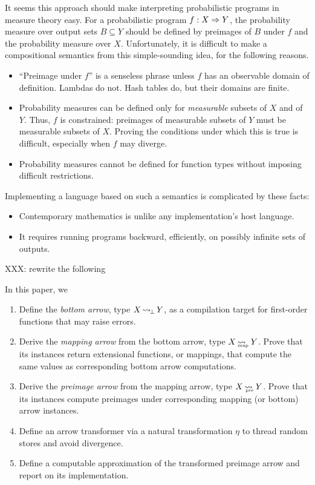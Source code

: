 \documentclass[preprint]{sigplanconf}
\newcommand{\arrow}{\rightsquigarrow}
\newcommand{\arrowtrans}{\ensuremath{\eta}}
\DeclareMathOperator{\botto}{\arrow_{\mspace{-3mu}\bot}}
\newcommand{\map}{_\mathrm{map}}
\DeclareMathOperator{\mapto}{\arrow_{\mspace{-21mu}\map}}
\newcommand{\pre}{_\mathrm{pre}}
\DeclareMathOperator{\preto}{\arrow_{\mspace{-19mu}\pre}}
\begin{document}
It seems this approach should make interpreting probabilistic programs in measure theory easy.
For a probabilistic program $f : X \Rightarrow Y$, the probability measure over output sets $B \subseteq Y$ should be defined by preimages of $B$ under $f$ and the probability measure over $X$.
Unfortunately, it is difficult to make a compositional semantics from this simple-sounding idea, for the following reasons.
\begin{itemize}
	\item ``Preimage under $f$'' is a senseless phrase unless $f$ has an observable domain of definition. Lambdas do not. Hash tables do, but their domains are finite.
	\item Probability measures can be defined only for \emph{measurable} subsets of $X$ and of $Y$. Thus, $f$ is constrained: preimages of measurable subsets of $Y$ must be measurable subsets of $X$. Proving the conditions under which this is true is difficult, especially when $f$ may diverge.
	\item Probability measures cannot be defined for function types without imposing difficult restrictions.
\end{itemize}
Implementing a language based on such a semantics is complicated by these facts:
\begin{itemize}
	\item Contemporary mathematics is unlike any implementation's host language.
	\item It requires running programs backward, efficiently, on possibly infinite sets of outputs.
\end{itemize}

XXX: rewrite the following

In this paper, we
\begin{enumerate}
	\item Define the \emph{bottom arrow}, type $X \botto Y$, as a compilation target for first-order functions that may raise errors.
	\item Derive the \emph{mapping arrow} from the bottom arrow, type $X \mapto Y$. Prove that its instances return extensional functions, or mappings, that compute the same values as corresponding bottom arrow computations.
	\item Derive the \emph{preimage arrow} from the mapping arrow, type $X \preto Y$. Prove that its instances compute preimages under corresponding mapping (or bottom) arrow instances.
	\item Define an arrow transformer via a natural transformation $\arrowtrans$ to thread random stores and avoid divergence.
	\item Define a computable approximation of the transformed preimage arrow and report on its implementation.
\end{enumerate}
\end{document}
